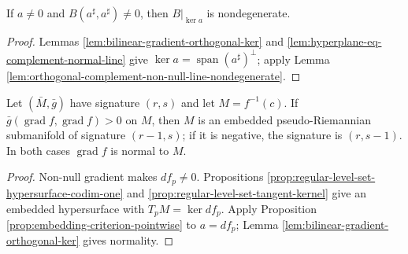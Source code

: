 \begin{lemma}
\label{lem:embedding-criterion-nondegenerate-pointwise}





If $a\ne0$ and $B(a^\sharp,a^\sharp)\ne0$, then $B|_{\ker a}$ is nondegenerate.
\end{lemma}
\begin{proof}

\sketch Lemmas \ref{lem:bilinear-gradient-orthogonal-ker} and \ref{lem:hyperplane-eq-complement-normal-line} give $\ker a=\operatorname{span}(a^\sharp)^\perp$; apply Lemma \ref{lem:orthogonal-complement-non-null-line-nondegenerate}.
\end{proof}

\begin{corollary}
\label{cor:pseudo-riemannian-embedding-criterion}





Let $(\bar M,\bar g)$ have signature $(r,s)$ and let $M=f^{-1}(c)$. If $\bar g(\operatorname{grad}f,\operatorname{grad}f)>0$ on $M$, then $M$ is an embedded pseudo-Riemannian submanifold of signature $(r-1,s)$; if it is negative, the signature is $(r,s-1)$. In both cases $\operatorname{grad}f$ is normal to $M$.
\end{corollary}
\begin{proof}

\sketch Non-null gradient makes $df_p\ne0$. Propositions \ref{prop:regular-level-set-hypersurface-codim-one} and \ref{prop:regular-level-set-tangent-kernel} give an embedded hypersurface with $T_pM=\ker df_p$. Apply Proposition \ref{prop:embedding-criterion-pointwise} to $a=df_p$; Lemma \ref{lem:bilinear-gradient-orthogonal-ker} gives normality.
\end{proof}

